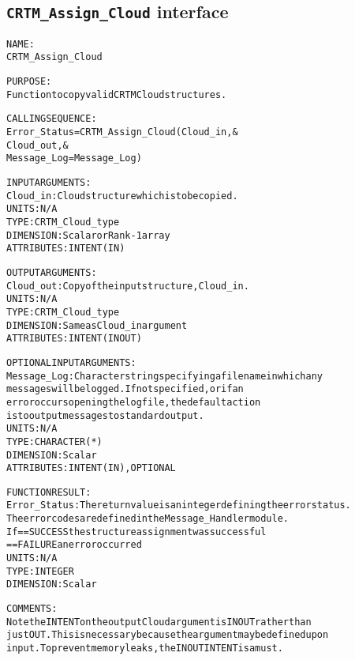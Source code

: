 \subsection{\texttt{CRTM\_Assign\_Cloud} interface}
  \label{sec:CRTM_Assign_Cloud_interface}
  \begin{alltt}
 
  NAME:
        CRTM_Assign_Cloud
 
  PURPOSE:
        Function to copy valid CRTM Cloud structures.
 
  CALLING SEQUENCE:
        Error_Status = CRTM_Assign_Cloud( Cloud_in               , &
                                          Cloud_out              , &
                                          Message_Log=Message_Log  )
 
  INPUT ARGUMENTS:
        Cloud_in:      Cloud structure which is to be copied.
                       UNITS:      N/A
                       TYPE:       CRTM_Cloud_type
                       DIMENSION:  Scalar or Rank-1 array
                       ATTRIBUTES: INTENT(IN)
 
  OUTPUT ARGUMENTS:
        Cloud_out:     Copy of the input structure, Cloud_in.
                       UNITS:      N/A
                       TYPE:       CRTM_Cloud_type
                       DIMENSION:  Same as Cloud_in argument
                       ATTRIBUTES: INTENT(IN OUT)
 
  OPTIONAL INPUT ARGUMENTS:
        Message_Log:   Character string specifying a filename in which any
                       messages will be logged. If not specified, or if an
                       error occurs opening the log file, the default action
                       is to output messages to standard output.
                       UNITS:      N/A
                       TYPE:       CHARACTER(*)
                       DIMENSION:  Scalar
                       ATTRIBUTES: INTENT(IN), OPTIONAL
 
  FUNCTION RESULT:
        Error_Status:  The return value is an integer defining the error status.
                       The error codes are defined in the Message_Handler module.
                       If == SUCCESS the structure assignment was successful
                          == FAILURE an error occurred
                       UNITS:      N/A
                       TYPE:       INTEGER
                       DIMENSION:  Scalar
 
  COMMENTS:
        Note the INTENT on the output Cloud argument is IN OUT rather than
        just OUT. This is necessary because the argument may be defined upon
        input. To prevent memory leaks, the IN OUT INTENT is a must.
 
  \end{alltt}
